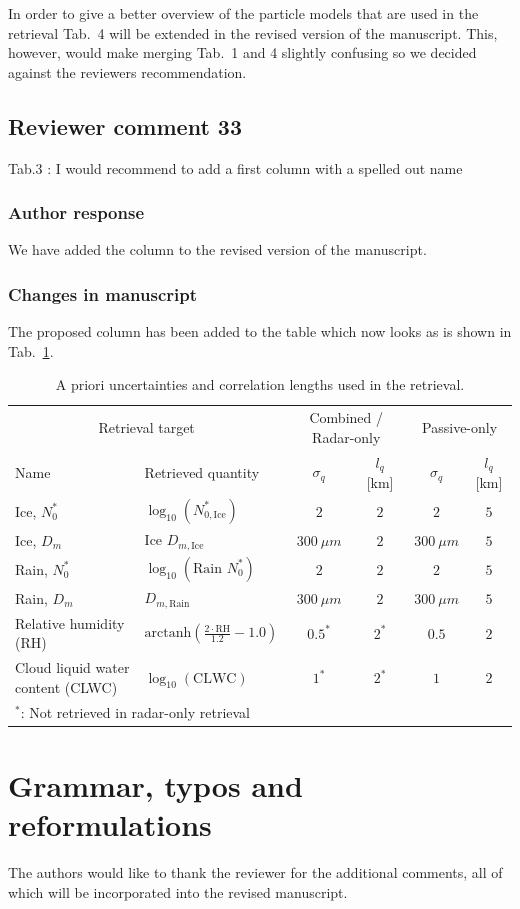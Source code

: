 In order to give a better overview of the particle models that are used
in the retrieval Tab.~4 will be extended in the revised version of the
manuscript.  This, however, would make merging Tab.~1 and 4 slightly confusing
so we decided against the reviewers recommendation.

\subsection*{Reviewer comment 33}

Tab.3 : I would recommend to add a first column with a spelled out name

\subsubsection*{Author response}

We have added the column to the revised version of the manuscript.

\subsubsection*{Changes in manuscript}

The proposed column has been added to the table which now looks as is shown
in Tab.~\ref{tab:a_priori}.

\begin{table}[h!]
\caption{A priori uncertainties and correlation
 lengths used in the retrieval.}
 \centering
\label{tab:a_priori}
  \begin{adjustbox}{max width=\textwidth}
    \begin{tabular}{ll|cc|cc|}
      \multicolumn{2}{c|}{Retrieval target}  & \multicolumn{2}{c|}{Combined / Radar-only} & \multicolumn{2}{c}{Passive-only}\\
      Name & Retrieved quantity &  $\sigma_q$ & $l_q$ [km] & $\sigma_q$ & $l_q$ [km]\\
    \hline
Ice, $N_0^*$ & $\log_{10}(N_{0, \text{Ice}}^*)$ & $2$ & $2$ & $2$ &$5$ \\
Ice, $D_m$ &   $\text{Ice }D_{m, \text{Ice}}$   & $300\ \unit{\mu m}$  & $2$ & $300\ \unit{\mu m}$          & $5$ \\
Rain, $N_0^*$ &    $\log_{10}(\text{Rain } N_{0}^*)$ & $2$ & $2$ & $2$ &$5$ \\
Rain, $D_m$ &  $D_{m, \text{Rain}}$   & $300\ \unit{\mu m}$  & $2$ & $300\ \unit{\mu m}$          & $5$ \\
Relative humidity (RH) & $\text{arctanh}(\frac{2 \cdot \text{RH}}{1.2} - 1.0)$ & $0.5^{*}$ & $2^{*}$ & $0.5$ & $2$ \\
Cloud liquid water content (CLWC) & $\log_{10}(\text{CLWC}) $ & $1^{*}$ & $2^{*}$  & $1$ & $2$ \\
\multicolumn{6}{l}{$^*$: Not retrieved in radar-only retrieval}
    \end{tabular}
    \end{adjustbox}
\end{table}
\section{Grammar, typos and reformulations}

The authors would like to thank the reviewer for the additional comments, all of
which will be incorporated into the revised manuscript.
